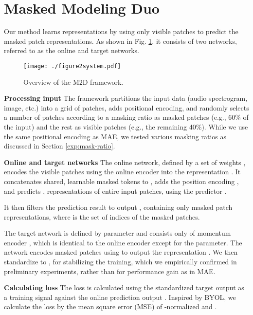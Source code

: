 \documentclass{article}
\begin{document}
\section{Masked Modeling Duo}
Our method learns representations by using only visible patches to predict the masked patch representations. As shown in Fig. \ref{fig:system}, it consists of two networks, referred to as the online and target networks.

\begin{figure}[tbhp]
  \vspace{-5pt}
  \centering
  \texttt{[image: ./figure2system.pdf]}
  \vspace{-3pt}
  \caption{Overview of the M2D framework.}
  \label{fig:system}
  \vspace{-5pt}
\end{figure}

\vspace{0.1cm}
\noindent\textbf{Processing input}\hspace{0.2cm}
The framework partitions the input data  (audio spectrogram, image, etc.) into a grid of patches, adds positional encoding, and randomly selects a number of patches according to a masking ratio as masked patches  (e.g., 60\% of the input) and the rest as visible patches  (e.g., the remaining 40\%).
While we use the same positional encoding as MAE\cite{he2022masked}, we tested various masking ratios as discussed in Section \ref{exp:mask-ratio}.

\noindent\textbf{Online and target networks}\hspace{0.2cm}
The online network, defined by a set of weights , encodes the visible patches  using the online encoder  into the representation .
It concatenates shared, learnable masked tokens  to , adds the position encoding , and predicts  , representations of entire input patches, using the predictor .

It then filters the prediction result  to output , containing only masked patch representations, where  is the set of indices of the masked patches.


The target network is defined by parameter  and consists only of momentum encoder , which is identical to the online encoder except for the parameter.
The network encodes masked patches  using  to output the representation .
We then standardize  to , for stabilizing the training, which we empirically confirmed in preliminary experiments, rather than for performance gain as in MAE.


\vspace{0.1cm}
\noindent\textbf{Calculating loss}\hspace{0.2cm}
The loss is calculated using the standardized target output  as a training signal against the online prediction output .
Inspired by BYOL\cite{grill2020byol}, we calculate the loss  by the mean square error (MSE) of -normalized  and .
\end{document}
